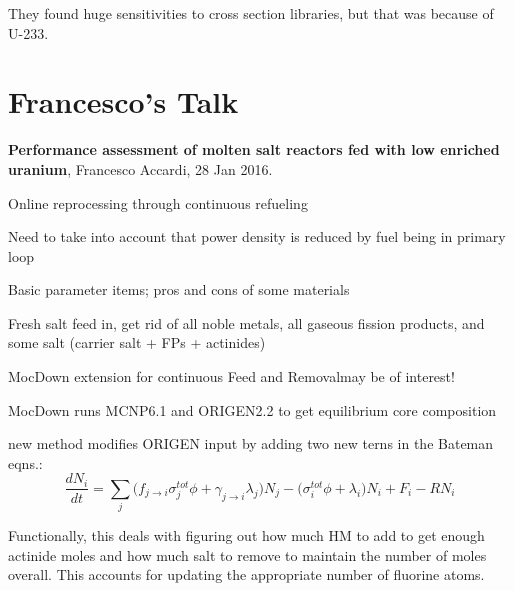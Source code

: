 \documentclass[12pt,twoside]{article}
\begin{document}
They found huge sensitivities to cross section libraries, but that was because
of U-233.


\section*{Francesco's Talk}
\textbf{Performance assessment of molten salt reactors fed with low enriched uranium}, Francesco Accardi, 28 Jan 2016.

\begin{compactitem}
\item Online reprocessing through continuous refueling
\item Need to take into account that power density is reduced by fuel being in primary loop
\item Basic parameter items; pros and cons of some materials
\item Fresh salt feed in, get rid of all noble metals, all gaseous fission products, and some salt (carrier salt + FPs + actinides)
\item MocDown extension for continuous Feed and Removal\textemdash may be of interest!
  \begin{compactitem}
  \item MocDown runs MCNP6.1 and ORIGEN2.2 to get equilibrium core composition
  \item new method modifies ORIGEN input by adding two new terns in the Bateman eqns.:
  \[\frac{dN_i}{dt} = \sum_j \bigl(f_{j\rightarrow i} \sigma_j^{tot} \phi + \gamma_{j\rightarrow i} \lambda_j\bigr)N_j - \bigl(\sigma_i^{tot}\phi + \lambda_i \bigr)N_i + F_i - RN_i\]
  \item Functionally, this deals with figuring out how much HM to add to get enough actinide moles and how much salt to remove to maintain the number of moles overall. This accounts for updating the appropriate number of fluorine atoms.
  \end{compactitem}
\end{compactitem}
\end{document}
